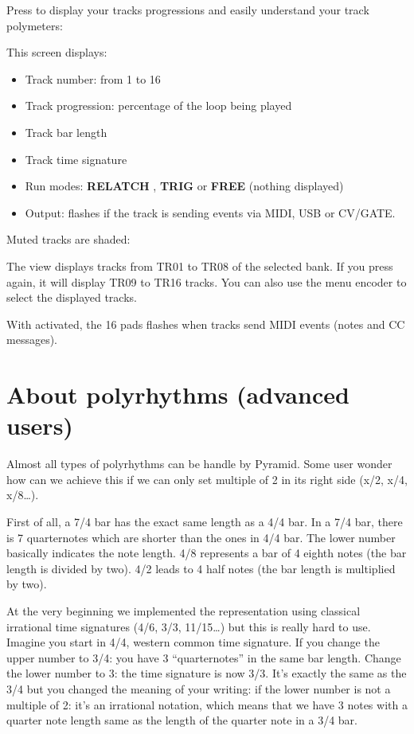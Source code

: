 Press  to display your tracks progressions and easily understand your track polymeters:


This screen displays:

\begin{itemize}
\item Track number: from 1 to 16
\item Track progression: percentage of the loop being played
\item Track bar length
\item Track time signature
\item Run modes: \textbf{RELATCH} , \textbf{TRIG}  or \textbf{FREE} (nothing displayed)
\item Output: flashes if the track is sending events via MIDI, USB or CV/GATE.
\end{itemize}

Muted tracks are shaded:


The  view displays tracks from TR01 to TR08 of the selected bank. If you press  again, it will display TR09 to TR16 tracks. You can also use the menu encoder to select the displayed tracks.

With  activated, the 16 pads flashes when tracks send MIDI events (notes and CC messages).


\section{About polyrhythms (advanced users)}

Almost all types of polyrhythms can be handle by Pyramid. Some user wonder how can we achieve this if we can only set multiple of 2 in its right side (x/2, x/4, x/8\ldots).

First of all, a 7/4 bar has the exact same length as a 4/4 bar. In a 7/4 bar, there is 7 quarternotes which are shorter than the ones in 4/4 bar. The lower number basically indicates the note length. 4/8 represents a bar of 4 eighth notes (the bar length is divided by two). 4/2 leads to 4 half notes (the bar length is multiplied by two).

At the very beginning we implemented the representation using classical irrational time signatures (4/6, 3/3, 11/15\ldots) but this is really hard to use. Imagine you start in 4/4, western common time signature. If you change the upper number to 3/4: you have 3 “quarternotes” in the same bar length. Change the lower number to 3: the time signature is now 3/3. It's exactly the same as the 3/4 but you changed the meaning of your writing: if the lower number is not a multiple of 2: it's an irrational notation, which means that we have 3 notes with a quarter note length same as the length of the quarter note in a 3/4 bar.

